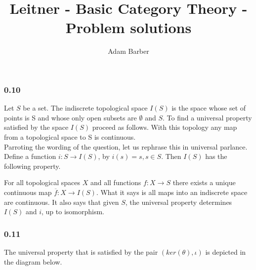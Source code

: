 \documentclass{article}
\begin{document}
\title{Leitner - Basic Category Theory - Problem solutions}
\author{Adam Barber}

\maketitle
\subsubsection*{0.10}

Let $S$ be a set. The indiscrete topological space $I(S)$ is the space whose set of points is S and whose only open subsets are $\emptyset$ and $S$.
To find a universal property satisfied by the space $I(S)$ proceed as follows.
With this topology any map from a topological space to S is continuous. \\

Parroting the wording of the question, let us rephrase this in
universal parlance. Define a function $i: S \rightarrow I(S)$, by $i(s) = s, s \in S$.
Then $I(S)$ has the following property.


\begin{center}
\end{center}

For all topological spaces $X$ and all functions
$f: X \rightarrow S$ there exists a unique continuous map $\overline{f}: X \rightarrow I(S)$. What it says is all maps into an indiscrete space are continuous. It also says that given $S$, the universal property determines $I(S)$ and $i$, up to isomorphism. \\

\subsubsection*{0.11}

The universal property that is satisfied by the pair $(ker(\theta),\iota)$ is depicted in the diagram below.
\end{document}
